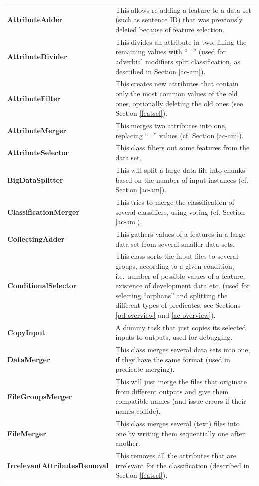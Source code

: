 \documentclass[12pt,notitlepage]{report}
\begin{document}
\footnotesize
\renewcommand{\arraystretch}{1.5}
\begin{longtable}{p{}p{}}
\bf AttributeAdder & This allows re-adding a feature to a data set (such as sentence ID) that was previously deleted because of feature selection. \\
\bf AttributeDivider & This divides an attribute in two, filling the remaining values with ``\_'' (used for adverbial modifiers split classification, as described in Section \ref{ac-am}). \\
\bf AttributeFilter & This creates new attributes that contain only the most common values of the old ones, optionally deleting the old ones (see Section \ref{featsel}). \\
\bf AttributeMerger & This merges two attributes into one, replacing ``\_'' values (cf. Section \ref{ac-am}). \\
\bf AttributeSelector & This class filters out some features from the data set. \\
\bf BigDataSplitter & This will split a large data file into chunks based on the number of input instances (cf. Section \ref{ac-am}). \\
\bf ClassificationMerger & This tries to merge the classification of several classifiers, using voting (cf. Section \ref{ac-am}). \\
\bf CollectingAdder & This gathers values of a features in a large data set from several smaller data sets. \\
\bf ConditionalSelector & This class sorts the input files to several groups, according to a given condition, i.e.\ number of possible values of a feature, existence of development data etc. (used for selecting ``orphans'' and splitting the different types of predicates, see Sections \ref{pd-overview} and \ref{ac-overview}). \\
\bf CopyInput & A dummy task that just copies its selected inputs to outputs, used for debugging. \\
\bf DataMerger & This class merges several data sets into one, if they have the same format (used in predicate merging). \\
\bf FileGroupsMerger & This will just merge the files that originate from different outputs and give them compatible names (and issue errors if their names collide). \\
\bf FileMerger & This class merges several (text) files into one by writing them sequentially one after another. \\
\bf IrrelevantAttributes\-Removal & This removes all the attributes that are irrelevant for the classification (described in Section \ref{featsel}). \\

\end{longtable}
\end{document}
